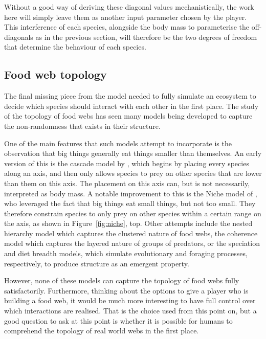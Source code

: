 Without a good way of deriving these diagonal values mechanistically, the work here will simply leave them as another input parameter chosen by the player. This interference of each species, alongside the body mass to parameterise the off-diagonals as in the previous section, will therefore be the two degrees of freedom that determine the behaviour of each species. 


\subsection{Food web topology}
\label{sec:topology}
The final missing piece from the model needed to fully simulate an ecosystem to decide which species should interact with each other in the first place.
The study of the topology of food webs has seen many models being developed to capture the non-randomness that exists in their structure.

One of the main features that such models attempt to incorporate is the observation that big things generally eat things smaller than themselves. An early version of this is the cascade model by \citet{Cohen2012}, which begins by placing every species along an axis, and then only allows species to prey on other species that are lower than them on this axis. The placement on this axis can, but is not necessarily, interpreted as body mass.
A notable improvement to this is the Niche model of \citet{Williams2000}, who leveraged the fact that big things eat small things, but not too small. They therefore constrain species to only prey on other species within a certain range on the axis, as shown in Figure~\ref{fig:niche}, top.
Other attempts include the nested hierarchy model \citep{Cattin2004} which captures the clustered nature of food webs, the coherence model \citep{Johnson2014} which captures the layered nature of groups of predators, or the speciation \citep{Rossberg2006} and diet breadth \citep{Petchey2008} models, which simulate evolutionary and foraging processes, respectively, to produce structure as an emergent property. 

However, none of these models can capture the topology of food webs fully satisfactorily. Furthermore, thinking about the options to give a player who is building a food web, it would be much more interesting to have full control over which interactions are realised. That is the choice used from this point on, but a good question to ask at this point is whether it is possible for humans to comprehend the topology of real world webs in the first place.

